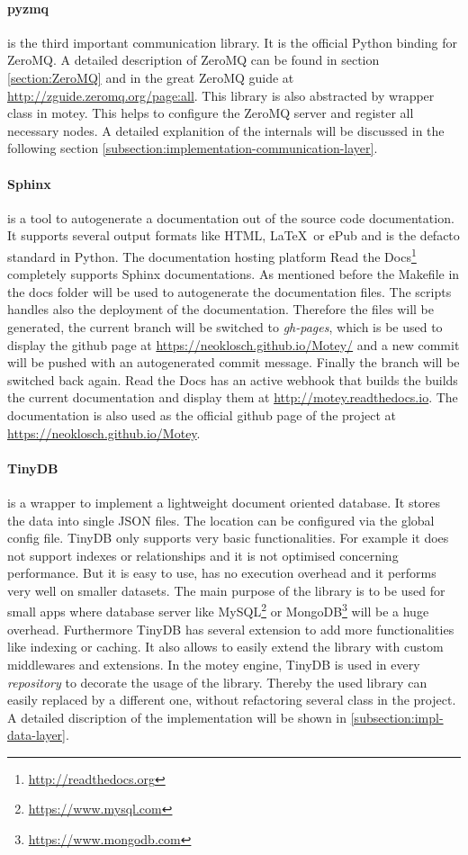 \paragraph{pyzmq} is the third important communication library.
It is the official Python binding for ZeroMQ.
A detailed description of ZeroMQ can be found in section \ref{section:ZeroMQ} and in the great ZeroMQ guide at \url{http://zguide.zeromq.org/page:all}.
This library is also abstracted by wrapper class in motey.
This helps to configure the ZeroMQ server and register all necessary nodes.
A detailed explanition of the internals will be discussed in the following section \ref{subsection:implementation-communication-layer}.

\paragraph{Sphinx} is a tool to autogenerate a documentation out of the source code documentation.
It supports several output formats like \ac{HTML}, \LaTeX\ or ePub and is the defacto standard in Python.
The documentation hosting platform Read the Docs\footnote{\url{http://readthedocs.org}} completely supports Sphinx documentations.
As mentioned before the Makefile in the docs folder will be used to autogenerate the documentation files.
The scripts handles also the deployment of the documentation.
Therefore the files will be generated, the current branch will be switched to \textit{gh-pages}, which is be used to display the github page at \url{https://neoklosch.github.io/Motey/} and a new commit will be pushed with an autogenerated commit message.
Finally the branch will be switched back again.
Read the Docs has an active webhook that builds the builds the current documentation and display them at \url{http://motey.readthedocs.io}.
The documentation is also used as the official github page of the project at \url{https://neoklosch.github.io/Motey}.

\paragraph{TinyDB} is a wrapper to implement a lightweight document oriented database.
It stores the data into single \ac{JSON} files.
The location can be configured via the global config file.
TinyDB only supports very basic functionalities.
For example it does not support indexes or relationships and it is not optimised concerning performance.
But it is easy to use, has no execution overhead and it performs very well on smaller datasets.
The main purpose of the library is to be used for small apps where database server like MySQL\footnote{\url{https://www.mysql.com}} or MongoDB\footnote{\url{https://www.mongodb.com}} will be a huge overhead.
Furthermore TinyDB has several extension to add more functionalities like indexing or caching.
It also allows to easily extend the library with custom middlewares and extensions.
In the motey engine, TinyDB is used in every \textit{repository} to decorate the usage of the library.
Thereby the used library can easily replaced by a different one, without refactoring several class in the project.
A detailed discription of the implementation will be shown in \ref{subsection:impl-data-layer}.

